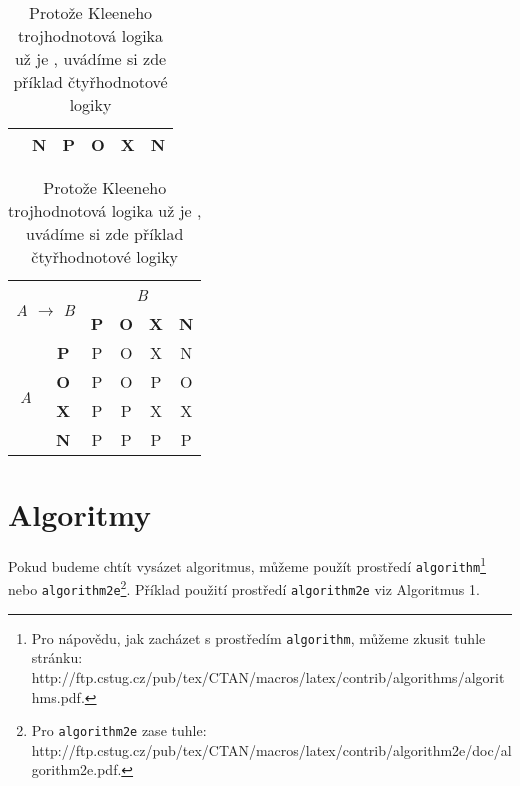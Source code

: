 \documentclass[a4paper,11pt, hidelinks]{article}
\begin{document}
\begin{table}[h]
\begin{subtable}{0.235\textwidth}
\begin{tabular}{|c|c|c|c|c|c|}
        \cline{2-6}
        & \textbf{N} & P & O & X & N \\
        \hline 
    \end{tabular}
\end{subtable}
\;
\begin{subtable}{0.235\textwidth}
    \centering
    \begin{tabular}{|c|c|c|c|c|c|}
        \hline
        \multicolumn{2}{|c|}{\multirow{2}{*}{\textit{A} $\to$ \textit{B}}} & \multicolumn{4}{|c|}{\textit{B}} \\
        \cline{3-6}
        \multicolumn{2}{|c|}{} &\textbf{P} & \textbf{O} & \textbf{X} & \textbf{N} \\
        \hline
        \multirow{4}{*}{\textit{A}} & \textbf{P} & P & O & X & N \\
        \cline{2-6}
        & \textbf{O} & P & O & P & O \\
        \cline{2-6}
        & \textbf{X} & P & P & X & X \\
        \cline{2-6}
        & \textbf{N} & P & P & P & P \\
        \hline 
    \end{tabular}
\end{subtable}
\label{tab:3}
\caption{Protože Kleeneho trojhodnotová logika už je , uvádíme si zde příklad čtyřhodnotové logiky}
\end{table}

\newpage %

\section{Algoritmy}
Pokud budeme chtít vysázet algoritmus, můžeme použít prostředí \texttt{algorithm}\footnote[2]{Pro nápovědu, jak zacházet s prostředím \texttt{algorithm}, můžeme zkusit tuhle stránku: \\
http://ftp.cstug.cz/pub/tex/CTAN/macros/latex/contrib/algorithms/algorithms.pdf.}
nebo \texttt{algorithm2e}\footnote[3]{Pro \texttt{algorithm2e} zase tuhle: http://ftp.cstug.cz/pub/tex/CTAN/macros/latex/contrib/algorithm2e/doc/algorithm2e.pdf.}.
Příklad použití prostředí \texttt{algorithm2e} viz Algoritmus 1.
\end{document}
